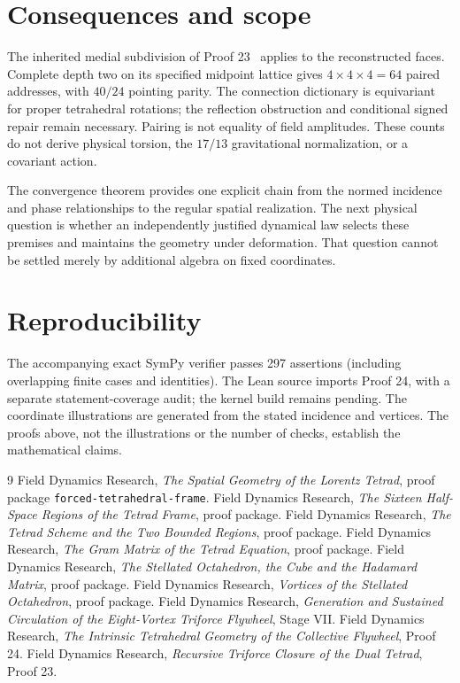 \ifdefined\balance\balance\fi
\section*{Consequences and scope}
The inherited medial subdivision of Proof 23~\cite{p23} applies to the reconstructed faces. Complete depth two on its specified midpoint lattice gives $4\times4\times4=64$ paired addresses, with $40/24$ pointing parity. The connection dictionary is equivariant for proper tetrahedral rotations; the reflection obstruction and conditional signed repair remain necessary. Pairing is not equality of field amplitudes. These counts do not derive physical torsion, the $17/13$ gravitational normalization, or a covariant action.

The convergence theorem provides one explicit chain from the normed incidence and phase relationships to the regular spatial realization. The next physical question is whether an independently justified dynamical law selects these premises and maintains the geometry under deformation. That question cannot be settled merely by additional algebra on fixed coordinates.

\section*{Reproducibility}
The accompanying exact SymPy verifier passes 297 assertions (including overlapping finite cases and identities). The Lean source imports Proof 24, with a separate statement-coverage audit; the kernel build remains pending. The coordinate illustrations are generated from the stated incidence and vertices. The proofs above, not the illustrations or the number of checks, establish the mathematical claims.

\begin{thebibliography}{9}
 Field Dynamics Research, \emph{The Spatial Geometry of the Lorentz Tetrad}, proof package \texttt{forced-tetrahedral-frame}.
 Field Dynamics Research, \emph{The Sixteen Half-Space Regions of the Tetrad Frame}, proof package.
 Field Dynamics Research, \emph{The Tetrad Scheme and the Two Bounded Regions}, proof package.
 Field Dynamics Research, \emph{The Gram Matrix of the Tetrad Equation}, proof package.
 Field Dynamics Research, \emph{The Stellated Octahedron, the Cube and the Hadamard Matrix}, proof package.
 Field Dynamics Research, \emph{Vortices of the Stellated Octahedron}, proof package.
 Field Dynamics Research, \emph{Generation and Sustained Circulation of the Eight-Vortex Triforce Flywheel}, Stage VII.
 Field Dynamics Research, \emph{The Intrinsic Tetrahedral Geometry of the Collective Flywheel}, Proof 24.
 Field Dynamics Research, \emph{Recursive Triforce Closure of the Dual Tetrad}, Proof 23.
\end{thebibliography}
